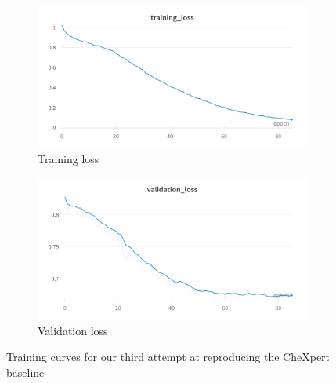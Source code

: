 \documentclass[11pt]{article}
\begin{document}
            \begin{figure}[H]
                 \centering
                 \begin{subfigure}[b]{0.45\textwidth}
                     \centering
                     \includegraphics[width=\textwidth]{plots/chexpert_training_loss3}
                     \caption{Training loss}
                     \vspace{4ex}
                     \label{fig:chexpert_training_loss3}
                 \end{subfigure}
                 \hfill
                 \begin{subfigure}[b]{0.45\textwidth}
                     \centering
                     \includegraphics[width=\textwidth]{plots/chexpert_validation_loss3}
                     \caption{Validation loss}
                     \vspace{4ex}
                     \label{fig:chexpert_validation_loss3}
                 \end{subfigure}
                 \label{fig:training_curves3}
                 \caption{Training curves for our third attempt at reproducing the CheXpert baseline}

            \end{figure}
\end{document}
